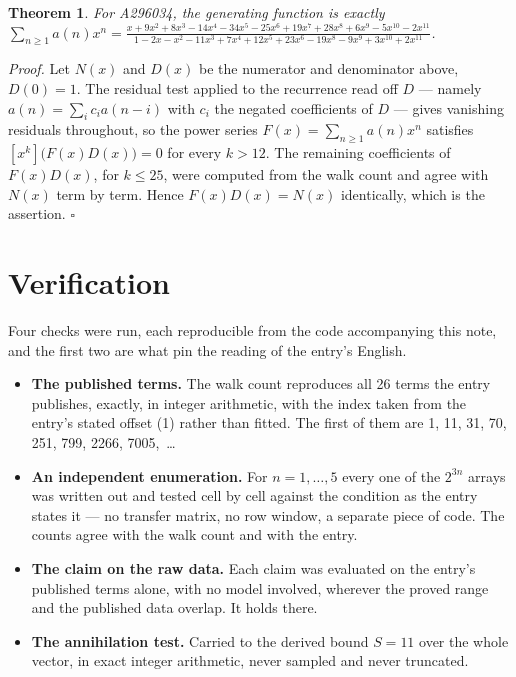 \documentclass[11pt]{article}
\newtheorem{theorem}{Theorem}
\theoremstyle{definition}
\begin{document}
\begin{theorem} For A296034, the generating function is exactly $\sum_{n\ge 1} a(n)x^n = \frac{x + 9x^{2} + 8x^{3} - 14x^{4} - 34x^{5} - 25x^{6} + 19x^{7} + 28x^{8} + 6x^{9} - 5x^{10} - 2x^{11}}{1 - 2x - x^{2} - 11x^{3} + 7x^{4} + 12x^{5} + 23x^{6} - 19x^{8} - 9x^{9} + 3x^{10} + 2x^{11}}$.\end{theorem}

{\itshape Proof.} Let $N(x)$ and $D(x)$ be the numerator and denominator above, $D(0)=1$. The residual test applied to the recurrence read off $D$ --- namely $a(n) = \sum_i c_i a(n-i)$ with $c_i$ the negated coefficients of $D$ --- gives vanishing residuals throughout, so the power series $F(x)=\sum_{n\ge 1}a(n)x^n$ satisfies $[x^k]\bigl(F(x)D(x)\bigr) = 0$ for every $k > 12$. The remaining coefficients of $F(x)D(x)$, for $k \le 25$, were computed from the walk count and agree with $N(x)$ term by term. Hence $F(x)D(x) = N(x)$ identically, which is the assertion. $\square$

\section{Verification}

Four checks were run, each reproducible from the code accompanying this note, and the first two are what pin the reading of the entry's English.

\begin{itemize}

\item {\bfseries The published terms.} The walk count reproduces all 26 terms the entry publishes, exactly, in integer arithmetic, with the index taken from the entry's stated offset (1) rather than fitted. The first of them are 1, 11, 31, 70, 251, 799, 2266, 7005,~\dots

\item {\bfseries An independent enumeration.} For $n = 1,\dots,5$ every one of the $2^{3n}$ arrays was written out and tested cell by cell against the condition as the entry states it --- no transfer matrix, no row window, a separate piece of code. The counts agree with the walk count and with the entry.

\item {\bfseries The claim on the raw data.} Each claim was evaluated on the entry's published terms alone, with no model involved, wherever the proved range and the published data overlap. It holds there.

\item {\bfseries The annihilation test.} Carried to the derived bound $S = 11$ over the whole vector, in exact integer arithmetic, never sampled and never truncated.

\end{itemize}
\end{document}
